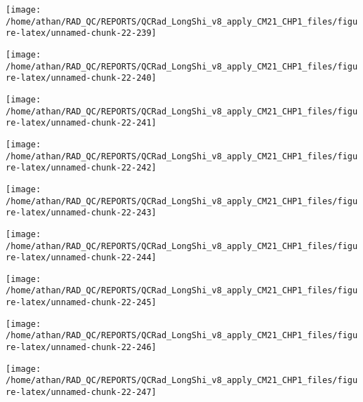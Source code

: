 \documentclass[
  10pt,
  a4paper,oneside]{article}
\begin{document}
\begin{center}\texttt{[image: /home/athan/RAD\_QC/REPORTS/QCRad\_LongShi\_v8\_apply\_CM21\_CHP1\_files/figure-latex/unnamed-chunk-22-239]} \end{center}

\begin{center}\texttt{[image: /home/athan/RAD\_QC/REPORTS/QCRad\_LongShi\_v8\_apply\_CM21\_CHP1\_files/figure-latex/unnamed-chunk-22-240]} \end{center}

\begin{center}\texttt{[image: /home/athan/RAD\_QC/REPORTS/QCRad\_LongShi\_v8\_apply\_CM21\_CHP1\_files/figure-latex/unnamed-chunk-22-241]} \end{center}

\begin{center}\texttt{[image: /home/athan/RAD\_QC/REPORTS/QCRad\_LongShi\_v8\_apply\_CM21\_CHP1\_files/figure-latex/unnamed-chunk-22-242]} \end{center}

\begin{center}\texttt{[image: /home/athan/RAD\_QC/REPORTS/QCRad\_LongShi\_v8\_apply\_CM21\_CHP1\_files/figure-latex/unnamed-chunk-22-243]} \end{center}

\begin{center}\texttt{[image: /home/athan/RAD\_QC/REPORTS/QCRad\_LongShi\_v8\_apply\_CM21\_CHP1\_files/figure-latex/unnamed-chunk-22-244]} \end{center}

\begin{center}\texttt{[image: /home/athan/RAD\_QC/REPORTS/QCRad\_LongShi\_v8\_apply\_CM21\_CHP1\_files/figure-latex/unnamed-chunk-22-245]} \end{center}

\begin{center}\texttt{[image: /home/athan/RAD\_QC/REPORTS/QCRad\_LongShi\_v8\_apply\_CM21\_CHP1\_files/figure-latex/unnamed-chunk-22-246]} \end{center}

\begin{center}\texttt{[image: /home/athan/RAD\_QC/REPORTS/QCRad\_LongShi\_v8\_apply\_CM21\_CHP1\_files/figure-latex/unnamed-chunk-22-247]} \end{center}
\end{document}
